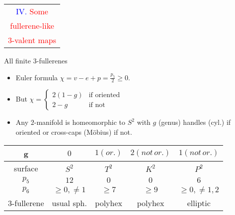 \documentclass[%
pdf,
colorBG,
slideColor,
]{prosper}
\begin{document}
\begin{slide}{}
\begin{center}
{\Huge 
\begin{tabular*}{6cm}{c}
\\[-0.5cm]
\textcolor{blue}{IV. }\textcolor{red}{Some}\\
\textcolor{red}{fullerene-like}\\
\textcolor{red}{3-valent maps}
\end{tabular*}
}
\end{center}
\end{slide}




\begin{slide}{All finite $3$-fullerenes}
\begin{itemize}
\item Euler formula $\chi=v-e+p=\frac{p_5}{2}\geq 0$.
\item But $\chi=\left\lbrace\begin{array}{rl}
2(1-g) &\mbox{if~oriented}\\
2-g    &\mbox{if~not}
\end{array}\right.$
\item Any $2$-manifold is homeomorphic to $S^2$ with $g$ (genus) handles (cyl.) if oriented or cross-caps (M\"obius) if not.
\end{itemize}

\begin{center}
\begin{tabular}{|c|c|c|c|c|}
\hline
g   & $0$   & $1(or.)$   &  $2 (not\, or.)$   &  $1(not\, or.)$\\
\hline
surface & $S^2$ & $T^2$ & $K^2$ &  $P^2$\\
\hline
$p_5$   & $12$  & $0$   &$0$    &  $6$\\
\hline
$p_6$   & $\geq 0, \not= 1$  & $\geq 7$  & $\geq 9$   &  $\geq 0, \not=1,2$\\
\hline
$3$-fullerene & usual sph. &polyhex  &polyhex   &elliptic\\
\hline
\end{tabular}
\end{center}
\end{slide}
\end{document}
